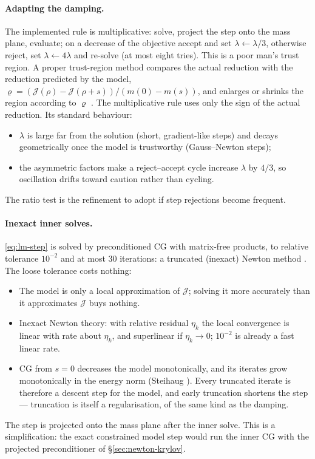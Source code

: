 \documentclass[11pt]{article}
\newcommand{\Jf}{\mathscr{J}}  %
\begin{document}
\paragraph{Adapting the damping.} The implemented rule is multiplicative:
solve, project the step onto the mass plane, evaluate; on a decrease of
the objective accept and set $\lambda\leftarrow\lambda/3$, otherwise
reject, set $\lambda\leftarrow4\lambda$ and re-solve (at most eight tries).
This is a poor man's trust region. A proper trust-region method compares
the actual reduction with the reduction predicted by the model,
$\varrho = (\Jf (\rho) - \Jf (\rho+s))/(m(0) - m(s))$, and enlarges or shrinks
the region according to $\varrho$ \cite{More1978,NocedalWright}. The
multiplicative rule uses only the sign of the actual reduction. Its
standard behaviour:
\begin{itemize}
\item $\lambda$ is large far from the solution (short, gradient-like
  steps) and decays geometrically once the model is trustworthy
  (Gauss--Newton steps);
\item the asymmetric factors make a reject--accept cycle increase
  $\lambda$ by $4/3$, so oscillation drifts toward caution rather than
  cycling.
\end{itemize}
The ratio test is the refinement to adopt if step rejections become
frequent.

\paragraph{Inexact inner solves.} \eqref{eq:lm-step} is solved by
preconditioned CG with matrix-free products, to relative tolerance
$10^{-2}$ and at most 30 iterations: a truncated (inexact) Newton method
\cite{DemboEisenstatSteihaug1982}. The loose tolerance costs nothing:
\begin{itemize}
\item The model is only a local approximation of $\Jf $; solving it more
  accurately than it approximates $\Jf $ buys nothing.
\item Inexact Newton theory: with relative residual $\eta_k$ the local
  convergence is linear with rate about $\eta_k$, and superlinear if
  $\eta_k\to0$; $10^{-2}$ is already a fast linear rate.
\item CG from $s = 0$ decreases the model monotonically, and its iterates
  grow monotonically in the energy norm (Steihaug \cite{Steihaug1983}).
  Every truncated iterate is therefore a descent step for the model, and
  early truncation shortens the step --- truncation is itself a
  regularisation, of the same kind as the damping.
\end{itemize}
The step is projected onto the mass plane after the inner solve. This is a
simplification: the exact constrained model step would run the inner CG
with the projected preconditioner of \S\ref{sec:newton-krylov}.
\end{document}

